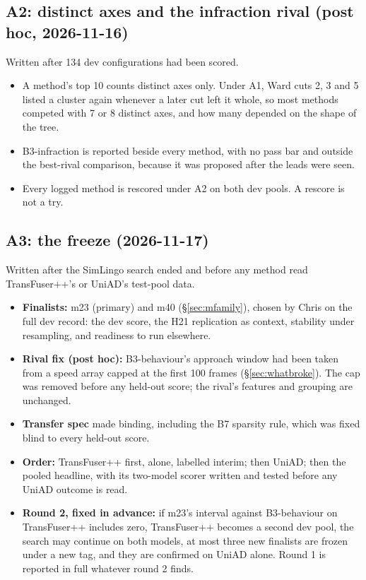 \subsection{A2: distinct axes and the infraction rival (post hoc, 2026-11-16)}

Written after 134 dev configurations had been scored.
\begin{itemize}
  \item A method's top 10 counts distinct axes only. Under A1, Ward cuts 2, 3
        and 5 listed a cluster again whenever a later cut left it whole, so most
        methods competed with 7 or 8 distinct axes, and how many depended on the
        shape of the tree.
  \item B3-infraction is reported beside every method, with no pass bar and
        outside the best-rival comparison, because it was proposed after the
        leads were seen.
  \item Every logged method is rescored under A2 on both dev pools. A rescore is
        not a try.
\end{itemize}

\subsection{A3: the freeze (2026-11-17)}
\label{sec:prereg-a3}

Written after the SimLingo search ended and before any method read TransFuser++'s
or UniAD's test-pool data.
\begin{itemize}
  \item \textbf{Finalists:} m23 (primary) and m40 (\S\ref{sec:mfamily}), chosen
        by Chris on the full dev record: the dev score, the H21 replication as
        context, stability under resampling, and readiness to run elsewhere.
  \item \textbf{Rival fix (post hoc):} B3-behaviour's approach window had been
        taken from a speed array capped at the first 100 frames
        (\S\ref{sec:whatbroke}). The cap was removed before any held-out score;
        the rival's features and grouping are unchanged.
  \item \textbf{Transfer spec} made binding, including the B7 sparsity rule,
        which was fixed blind to every held-out score.
  \item \textbf{Order:} TransFuser++ first, alone, labelled interim; then UniAD;
        then the pooled headline, with its two-model scorer written and tested
        before any UniAD outcome is read.
  \item \textbf{Round 2, fixed in advance:} if m23's interval against
        B3-behaviour on TransFuser++ includes zero, TransFuser++ becomes a
        second dev pool, the search may continue on both models, at most three
        new finalists are frozen under a new tag, and they are confirmed on UniAD
        alone. Round 1 is reported in full whatever round 2 finds.
\end{itemize}

